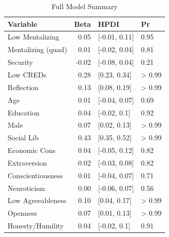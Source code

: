 \documentclass[]{article}
\begin{document}
\begin{table}

\caption{\label{tab:full model table}Full Model Summary}
\centering
\begin{tabular}[t]{lrll}
\toprule
Variable & Beta & HPDI & Pr\\
\midrule
Low Mentalizing & 0.05 & [-0.01, 0.11] & 0.95\\
Mentalizing (quad) & 0.01 & [-0.02, 0.04] & 0.81\\
Security & -0.02 & [-0.08, 0.04] & 0.21\\
Low CREDs & 0.28 & [0.23, 0.34] & > 0.99\\
Reflection & 0.13 & [0.08, 0.19] & > 0.99\\
\addlinespace
\hspace{1em}Age & 0.01 & [-0.04, 0.07] & 0.69\\
\hspace{1em}Education & 0.04 & [-0.02, 0.1] & 0.92\\
\hspace{1em}Male & 0.07 & [0.02, 0.13] & > 0.99\\
\hspace{1em}Social Lib & 0.43 & [0.35, 0.52] & > 0.99\\
\hspace{1em}Economic Cons & 0.04 & [-0.05, 0.12] & 0.82\\
\addlinespace
\hspace{1em}Extraversion & 0.02 & [-0.03, 0.08] & 0.82\\
\hspace{1em}Conscientiousness & 0.01 & [-0.04, 0.07] & 0.71\\
\hspace{1em}Neuroticism & 0.00 & [-0.06, 0.07] & 0.56\\
\hspace{1em}Low Agreeableness & 0.10 & [0.04, 0.17] & > 0.99\\
\hspace{1em}Openness & 0.07 & [0.01, 0.13] & > 0.99\\
\addlinespace
\hspace{1em}Honesty/Humility & 0.04 & [-0.02, 0.1] & 0.91\\
\bottomrule
\end{tabular}
\end{table}
\end{document}
